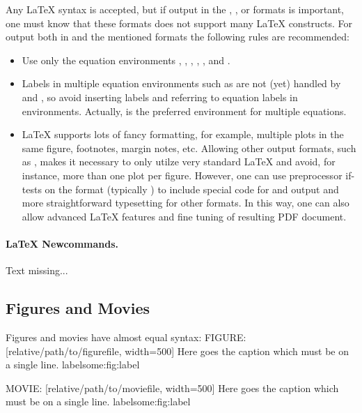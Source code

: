 \documentclass[%
oneside,                 %
final,                   %
chapterprefix=true,      %
open=right               %
10pt]{book}
\begin{document}
{Any {\LaTeX} syntax is accepted, but if output in the , ,
or  formats
is important, one must know that these formats does not support many
{\LaTeX} constructs. For output both in  and the mentioned formats
the following rules are recommended:

\begin{itemize}
  \item Use only the equation environments \code{\[}, \code{\]},
    , , , and .

  \item Labels in multiple equation environments such as  are
    not (yet) handled by  and , so avoid inserting
    labels and referring  to equation labels in  environments.
    Actually,  is the preferred environment for multiple equations.

  \item {\LaTeX} supports lots of fancy formatting, for example, multiple
    plots in the same figure, footnotes, margin notes, etc.
    Allowing other output formats, such as , makes it necessary
    to only utilze very standard {\LaTeX} and avoid, for instance, more than
    one plot per figure. However, one can use preprocessor if-tests on
    the format (typically ) to
    include special code for  and  output and more
    straightforward typesetting for other formats. In this way, one can
    also allow advanced {\LaTeX} features and fine tuning of resulting
    PDF document.
\end{itemize}

\noindent
\paragraph{LaTeX Newcommands.}
Text missing...

\subsection{Figures and Movies}

Figures and movies have almost equal syntax:
\bccq
FIGURE: [relative/path/to/figurefile, width=500] Here goes the caption which must be on a single line. label{some:fig:label}

MOVIE: [relative/path/to/moviefile, width=500] Here goes the caption which must be on a single line. label{some:fig:label}

}
\end{document}

